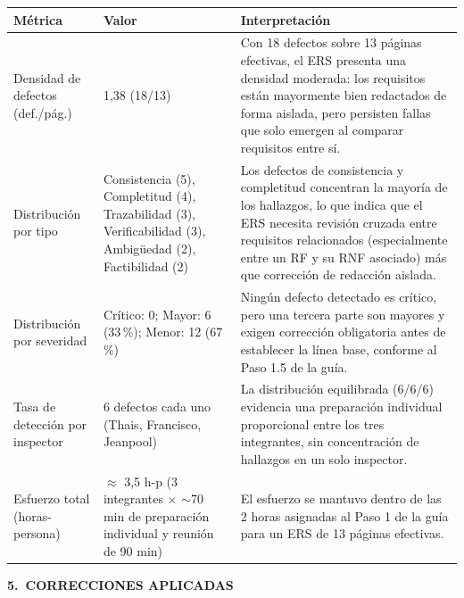 \documentclass[11pt,a4paper]{article}
\newcommand{\seccion}[2]{%
  \vspace{0.6cm}
  \noindent
  {\color{white}\colorbox{uteqverde}{%
    \parbox[c][1.05cm]{\dimexpr\textwidth-16pt\relax}{%
      \hspace{6pt}\textbf{\large #1\ #2}%
    }%
  }}%
  \vspace{0.35cm}
  \par
}
\begin{document}
\begin{longtable}{p{3.6cm}p{2.4cm}p{7.2cm}}
\toprule
\textbf{Métrica} & \textbf{Valor} & \textbf{Interpretación} \\
\midrule
\endhead
Densidad de defectos (def./pág.) & 1{,}38 (18/13) & Con 18 defectos sobre 13 páginas
efectivas, el ERS presenta una densidad moderada: los requisitos están
mayormente bien redactados de forma aislada, pero persisten fallas que solo
emergen al comparar requisitos entre sí. \\
\addlinespace
Distribución por tipo & Consistencia (5), Completitud (4), Trazabilidad (3),
Verificabilidad (3), Ambigüedad (2), Factibilidad (2) & Los defectos de
consistencia y completitud concentran la mayoría de los hallazgos, lo que
indica que el ERS necesita revisión cruzada entre requisitos relacionados
(especialmente entre un RF y su RNF asociado) más que corrección de redacción
aislada. \\
\addlinespace
Distribución por severidad & Crítico: 0; Mayor: 6 (33\,\%); Menor: 12 (67\,\%) &
Ningún defecto detectado es crítico, pero una tercera parte son mayores y
exigen corrección obligatoria antes de establecer la línea base, conforme al
Paso 1.5 de la guía. \\
\addlinespace
Tasa de detección por inspector & 6 defectos cada uno (Thais, Francisco,
Jeanpool) & La distribución equilibrada (6/6/6) evidencia una preparación
individual proporcional entre los tres integrantes, sin concentración de
hallazgos en un solo inspector. \\
\addlinespace
Esfuerzo total (horas-persona) & $\approx$ 3,5 h-p (3 integrantes $\times$
$\sim$70 min de preparación individual y reunión de 90 min) & El esfuerzo se
mantuvo dentro de las 2 horas asignadas al Paso 1 de la guía para un ERS de 13
páginas efectivas. \\
\bottomrule
\end{longtable}

\seccion{5.}{CORRECCIONES APLICADAS}
\end{document}
